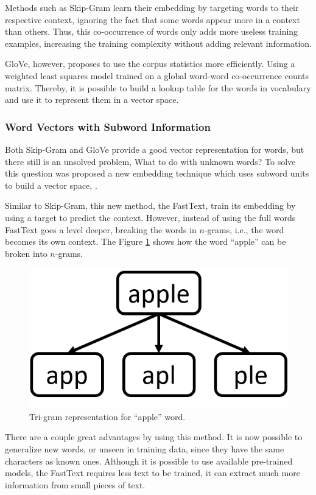 	Methods such as Skip-Gram learn their embedding by targeting words to their respective context, ignoring the fact that some words appear more in a context than others. Thus, this co-occurrence of words only adds more useless training examples, increasing the training complexity without adding relevant information.
	
	GloVe, however, proposes to use the corpus statistics more efficiently. Using a weighted least squares model trained on a global word-word co-occurrence counts matrix. Thereby, it is possible to build a lookup table for the words in vocabulary and use it to represent them in a vector space.
	
	
	\subsubsection{Word Vectors with Subword Information}
		
	Both Skip-Gram and GloVe provide a good vector representation for words, but there still is an unsolved problem, What to do with unknown words? To solve this question was proposed a new embedding technique which uses subword units to build a vector space, \cite{bojanowski2017enriching}.
	
	Similar to Skip-Gram, this new method, the FastText, train its embedding by using a target to predict the context. However, instead of using the full words FastText goes a level deeper, breaking the words in $n$-grams, i.e., the word becomes its own context. The Figure \ref{fig:apple-tri-gram} shows how the word ``apple'' can be broken into $n$-grams. 
		
	\begin{figure}[h!]
		\centering
		\includegraphics[width=0.3\linewidth]{01.Chapters/02.Background/apple-tri-gram}
		\caption{Tri-gram representation for ``apple'' word.}
		\label{fig:apple-tri-gram}
	\end{figure}
	
	There are a couple great advantages by using this method. It is now possible to generalize new words, or unseen in training data, since they have the same characters as known ones. Although it is possible to use available pre-trained models, the FastText requires less text to be trained, it can extract much more information from small pieces of text.	
	
